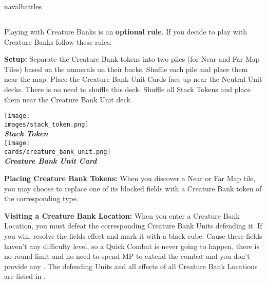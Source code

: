 \begin{expansion}{navalbattles}
  \begin{multicols*}{2}
  \subsection*{}
  Playing with Creature Banks is an \textbf{optional rule}.
  If you decide to play with Creature Banks follow these rules:\par
  \vspace*{1em}
  \textbf{Setup:} Separate the Creature Bank tokens into two piles (for Near and Far Map Tiles) based on the numerals on their backs.
  Shuffle each pile and place them near the map.
  Place the Creature Bank Unit Cards face up near the Neutral Unit decks.
  There is no need to shuffle this deck.
  Shuffle all Stack Tokens and place them near the Creature Bank Unit deck.

  \bigskip
  \begin{multicols*}{2}
    \begin{center}
      \vspace*{\fill}
      \texttt{[image: \\images/stack\_token.png]}\\
      \textbf{\footnotesize\textit{\textcolor{darkcandyapplered}{Stack Token}}}\\
      \vspace*{\fill}
      \columnbreak
      \texttt{[image: \\cards/creature\_bank\_unit.png]}\\
      \textbf{\footnotesize\textit{\textcolor{darkcandyapplered}{Creature Bank Unit Card}}}
    \end{center}
  \end{multicols*}

  \textbf{Placing Creature Bank Tokens:} When you discover a Near or Far Map tile, you may choose to replace one of its blocked fields with a Creature Bank token of the corresponding type.\par
  \textbf{Visiting a Creature Bank Location:} When you enter a Creature Bank Location, you must defeat the corresponding Creature Bank Units defending it.
  If you win, resolve the fields effect and mark it with a black cube.
  Cause these fields haven't any difficulty level, so a Quick Combat is never going to happen, there is no round limit and no need to spend MP to extend the combat and you don't provide any .
  The defending Units and all effects of all Creature Bank Locations are listed in .


\end{multicols*}
\end{expansion}

